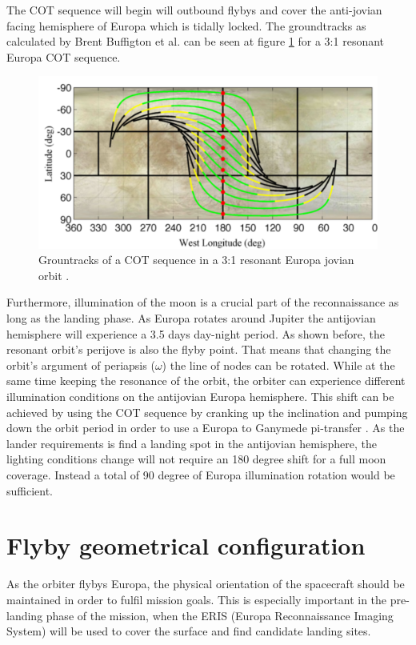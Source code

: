 \noindent
The COT sequence will begin will outbound flybys and cover the anti-jovian facing hemisphere of Europa which is tidally locked. The groundtracks as calculated by Brent Buffigton et al. \cite{cotseq} can be seen at figure \ref{fig:ground_tr} for a 3:1 resonant Europa COT sequence.

\begin{figure}[htb!]
\centering
\includegraphics[scale=0.3]{figures/Orbiter/groundtr.png}
\caption{Grountracks of a COT sequence in a 3:1 resonant Europa jovian orbit \cite{cotseq}.}
\label{fig:ground_tr}
\end{figure}

\noindent
Furthermore, illumination of the moon is a crucial part of the reconnaissance as long as the landing phase. As Europa rotates around Jupiter the antijovian hemisphere will experience a 3.5 days day-night period. As shown before, the resonant orbit's perijove is also the flyby point. That means that changing the orbit's argument of periapsis ($\omega$) the line of nodes can be rotated. While at the same time keeping the resonance of the orbit, the orbiter can experience different illumination conditions on the antijovian Europa hemisphere. This shift can be achieved by using the COT sequence by cranking up the inclination and pumping down the orbit period in order to use a Europa to Ganymede pi-transfer \cite{cotseq}. As the lander requirements is find a landing spot in the antijovian hemisphere, the lighting conditions change will not require an 180 degree shift for a full moon coverage. Instead a total of 90 degree of Europa illumination rotation would be sufficient.  
\section{Flyby geometrical configuration}
As the orbiter flybys Europa, the physical orientation of the spacecraft should be maintained in order to fulfil mission goals. This is especially important in the pre-landing phase of the mission, when the ERIS (Europa Reconnaissance Imaging System) will be used to cover the surface and find candidate landing sites. 

